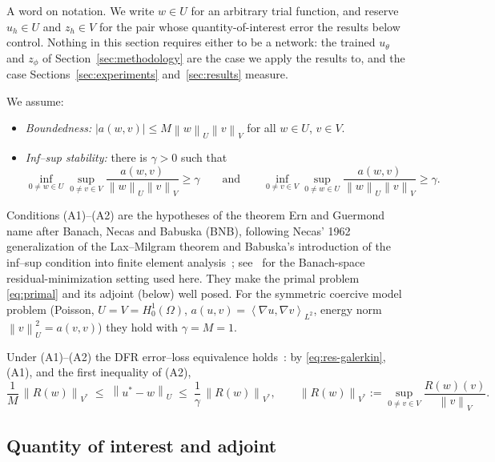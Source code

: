 \documentclass[preprint,11pt]{elsarticle}
\newcommand{\norm}[1]{\left\|#1\right\|}
\newcommand{\inner}[2]{\left\langle #1, #2 \right\rangle}
\begin{document}
A word on notation. We write $w \in U$ for an arbitrary trial function, and reserve $u_h \in U$ and $z_h \in V$ for the pair whose quantity-of-interest error the results below control. Nothing in this section requires either to be a network: the trained $u_\theta$ and $z_\phi$ of Section~\ref{sec:methodology} are the case we apply the results to, and the case Sections~\ref{sec:experiments} and~\ref{sec:results} measure.

We assume:
\begin{itemize}
  \item[(A1)] \emph{Boundedness:} $|a(w,v)| \leq M \norm{w}_U \norm{v}_V$ for all $w \in U$, $v \in V$.
  \item[(A2)] \emph{Inf--sup stability:} there is $\gamma > 0$ such that
  \begin{equation*}
    \inf_{0 \neq w \in U} \sup_{0 \neq v \in V} \frac{a(w,v)}{\norm{w}_U \norm{v}_V} \geq \gamma
    \qquad \text{and} \qquad
    \inf_{0 \neq v \in V} \sup_{0 \neq w \in U} \frac{a(w,v)}{\norm{w}_U \norm{v}_V} \geq \gamma .
  \end{equation*}
\end{itemize}
Conditions (A1)--(A2) are the hypotheses of the theorem Ern and Guermond~\citep{ern2004theory} name after Banach, Necas and Babuska (BNB), following Necas' 1962 generalization of the Lax--Milgram theorem and Babuska's introduction of the inf--sup condition into finite element analysis~\citep{babuska1971errorbounds}; see~\citep{muga2020discretization} for the Banach-space residual-minimization setting used here. They make the primal problem \eqref{eq:primal} and its adjoint (below) well posed. For the symmetric coercive model problem (Poisson, $U = V = H^1_0(\Omega)$, $a(u,v) = \inner{\nabla u}{\nabla v}_{L^2}$, energy norm $\norm{v}_U^2 = a(v,v)$) they hold with $\gamma = M = 1$.

Under (A1)--(A2) the DFR error--loss equivalence holds~\citep{taylor2023deep}: by \eqref{eq:res-galerkin}, (A1), and the first inequality of (A2),
\begin{equation}
  \label{eq:dfr-equiv}
  \frac{1}{M}\,\norm{R(w)}_{V^*} \;\leq\; \norm{u^* - w}_U \;\leq\; \frac{1}{\gamma}\,\norm{R(w)}_{V^*},
  \qquad
  \norm{R(w)}_{V^*} := \sup_{0 \neq v \in V} \frac{R(w)(v)}{\norm{v}_V}.
\end{equation}

\subsection{Quantity of interest and adjoint}
\end{document}
